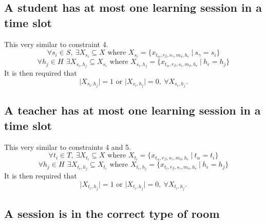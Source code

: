 \documentclass[a4paper, 12pt]{report}
\begin{document}
\subsection{A student has at most one learning session in a time slot}

This very similar to constraint 4.
\begin{equation*}
	\forall s_i \in S, \: \exists X_{s_i} \subseteq X \text{ where } X_{s_i} = 
	\{ x_{t_{\alpha},r_{\beta},s_{\gamma},m_{\delta},h_{\epsilon}} \: | \: 
	s_{\gamma} = s_i\}
\end{equation*}
\begin{equation*}
	\forall h_j \in H\, \: \exists X_{s_i,h_j} \subseteq X_{s_i} \text{ where }
	X_{s_i,h_j} = \{ x_{t_{\alpha}, r_{\beta}, s_i, m_{\delta}, h_{\epsilon}} 
	\: | \: h_{\epsilon} = h_j \}
\end{equation*}
It is then required that
\begin{equation*}
	\lvert X_{s_i,h_j} \rvert = 1 \text{ or } \lvert X_{s_i,h_j} \rvert = 0, \: 
	\forall X_{s_i,h_j}.
\end{equation*}

\subsection{A teacher has at most one learning session in a time slot}

This very similar to constraints 4 and 5.
\begin{equation*}
	\forall t_i \in T, \: \exists X_{t_i} \subseteq X \text{ where } X_{t_i} = 
	\{ x_{t_{\alpha},r_{\beta},s_{\gamma},m_{\delta},h_{\epsilon}} \: | \: 
	t_{\alpha} = t_i\}
\end{equation*}
\begin{equation*}
	\forall h_j \in H\, \: \exists X_{t_i,h_j} \subseteq X_{t_i} \text{ where }
	X_{t_i,h_j} = \{ x_{t_i, r_{\beta}, s_{\gamma}, m_{\delta}, h_{\epsilon}} 
	\: | \: h_{\epsilon} = h_j \}
\end{equation*}
It is then required that
\begin{equation*}
	\lvert X_{t_i,h_j} \rvert = 1 \text{ or } \lvert X_{t_i,h_j} \rvert = 0, \: 
	\forall X_{t_i,h_j}.
\end{equation*}

\subsection{A session is in the correct type of room}
\end{document}
